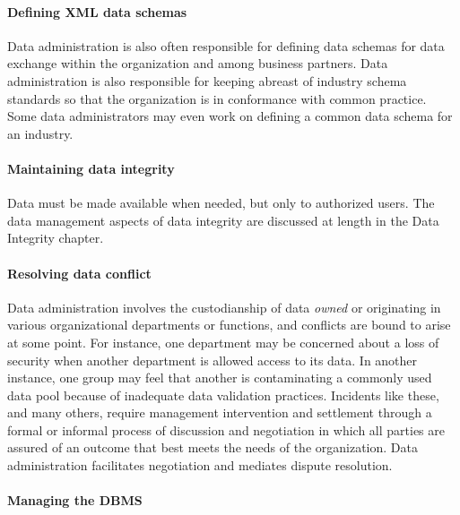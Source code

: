\documentclass[
]{article}
\begin{document}
\hypertarget{defining-xml-data-schemas}{%
\paragraph*{Defining XML data schemas}\label{defining-xml-data-schemas}}

Data administration is also often responsible for defining data schemas
for data exchange within the organization and among business partners.
Data administration is also responsible for keeping abreast of industry
schema standards so that the organization is in conformance with common
practice. Some data administrators may even work on defining a common
data schema for an industry.

\hypertarget{maintaining-data-integrity}{%
\paragraph*{Maintaining data integrity}\label{maintaining-data-integrity}}

Data must be made available when needed, but only to authorized users.
The data management aspects of data integrity are discussed at length in
the Data Integrity chapter.

\hypertarget{resolving-data-conflict}{%
\paragraph*{Resolving data conflict}\label{resolving-data-conflict}}

Data administration involves the custodianship of data \emph{owned} or
originating in various organizational departments or functions, and
conflicts are bound to arise at some point. For instance, one department
may be concerned about a loss of security when another department is
allowed access to its data. In another instance, one group may feel that
another is contaminating a commonly used data pool because of inadequate
data validation practices. Incidents like these, and many others,
require management intervention and settlement through a formal or
informal process of discussion and negotiation in which all parties are
assured of an outcome that best meets the needs of the organization.
Data administration facilitates negotiation and mediates dispute
resolution.

\hypertarget{managing-the-dbms}{%
\paragraph*{Managing the DBMS}\label{managing-the-dbms}}
\end{document}
